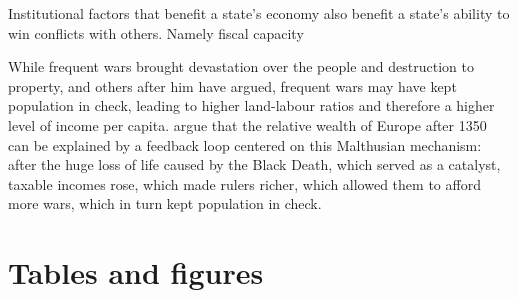 \documentclass{article}
\begin{document}
Institutional factors that benefit a state's economy also benefit a state's ability to win conflicts with others. Namely fiscal capacity


While frequent wars brought devastation over the people and destruction to property, \cite{malthus1798} and others after him have argued, frequent wars may have kept population in check, leading to higher land-labour ratios and therefore a higher level of income per capita. \cite{voigtlnder2013} argue that the relative wealth of Europe after 1350 can be explained by a feedback loop centered on this Malthusian mechanism: after the huge loss of life caused by the Black Death, which served as a catalyst, taxable incomes rose, which made rulers richer, which allowed them to afford more wars, which in turn kept population in check.









\newpage
\onehalfspacing



\newpage
\section*{Tables and figures}
\end{document}
